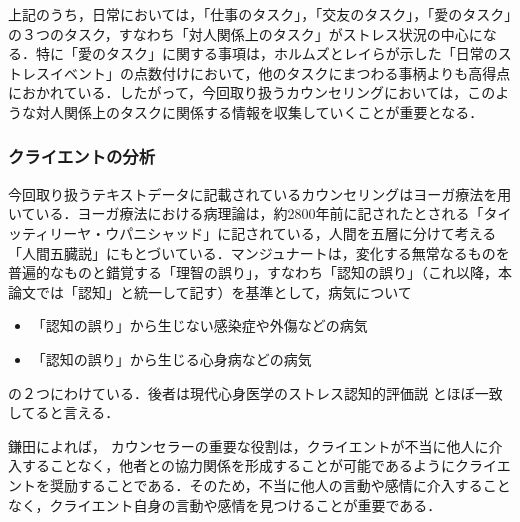 \documentclass[shuuron]{kuee}
\begin{document}
上記のうち，日常においては，「仕事のタスク」，「交友のタスク」，「愛のタスク」の３つのタスク，すなわち「対人関係上のタスク」がストレス状況の中心になる．特に「愛のタスク」に関する事項は，ホルムズとレイら\cite{holmes1967social}が示した「日常のストレスイベント」の点数付けにおいて，他のタスクにまつわる事柄よりも高得点におかれている．したがって，今回取り扱うカウンセリングにおいては，このような対人関係上のタスクに関係する情報を収集していくことが重要となる．











\subsubsection{クライエントの分析}%

今回取り扱うテキストデータに記載されているカウンセリングはヨーガ療法を用いている．ヨーガ療法における病理論は，約2800年前に記されたとされる「タイッティリーヤ・ウパニシャッド」に記されている，人間を五層に分けて考える「人間五臓説」にもとづいている\cite{kimura}．マンジュナート\cite{manjunath}は，変化する無常なるものを普遍的なものと錯覚する「理智の誤り」，すなわち「認知の誤り」（これ以降，本論文では「認知」と統一して記す）を基準として，病気について
\begin{itemize}
  \item 「認知の誤り」から生じない感染症や外傷などの病気
  \item 「認知の誤り」から生じる心身病などの病気
\end{itemize}
の２つにわけている．後者は現代心身医学のストレス認知的評価説
\cite{Lazarus}とほぼ一致してると言える\cite{Darshana}．


鎌田\cite{kamata2002}によれば， カウンセラーの重要な役割は，クライエントが不当に他人に介入することなく，他者との協力関係を形成することが可能であるようにクライエントを奨励することである．そのため，不当に他人の言動や感情に介入することなく，クライエント自身の言動や感情を見つけることが重要である．
\end{document}
